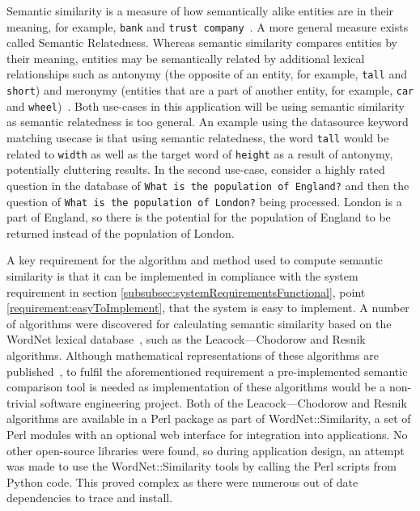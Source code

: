 \documentclass[authoryearcitations]{UoYCSproject}
\begin{document}
Semantic similarity is a measure of how semantically alike entities are in their meaning, for example, \texttt{bank} and \texttt{trust company}~\cite{Budanitsky:2006:EWM:1168106.1168108}. A more general measure exists called Semantic Relatedness. Whereas semantic similarity compares entities by their meaning, entities may be semantically related by additional lexical relationships such as antonymy (the opposite of an entity, for example, \texttt{tall} and \texttt{short}) and meronymy (entities that are a part of another entity, for example, \texttt{car} and \texttt{wheel})~\cite{Budanitsky:2006:EWM:1168106.1168108, budanitsky2001semantic}. Both use-cases in this application will be using semantic similarity as semantic relatedness is too general. An example using the datasource keyword matching usecase is that using semantic relatedness, the word \texttt{tall} would be related to \texttt{width} as well as the target word of \texttt{height} as a result of antonymy, potentially cluttering results. In the second use-case, consider a highly rated question in the database of \texttt{What is the population of England?} and then the question of \texttt{What is the population of London?} being processed. London is a part of England, so there is the potential for the population of England to be returned instead of the population of London.

A key requirement for the algorithm and method used to compute semantic similarity is that it can be implemented in compliance with the system requirement in section \ref{subsubsec:systemRequirementsFunctional}, point \ref{requirement:easyToImplement}, that the system is easy to implement. A number of algorithms were discovered for calculating semantic similarity based on the WordNet lexical database~\cite{wordNet}, such as the Leacock--–Chodorow and Resnik algorithms. Although mathematical representations of these algorithms are published~\cite{leacock1998combining,resnik1995using}, to fulfil the aforementioned requirement a pre-implemented semantic comparison tool is needed as implementation of these algorithms would be a non-trivial software engineering project. Both of the Leacock--–Chodorow and Resnik algorithms are available in a Perl package as part of WordNet::Similarity, a set of Perl modules with an optional web interface for integration into applications. No other open-source libraries were found, so during application design, an attempt was made to use the WordNet::Similarity tools by calling the Perl scripts from Python code. This proved complex as there were numerous out of date dependencies to trace and install.
\end{document}
